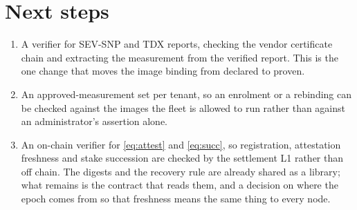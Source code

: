 \documentclass[11pt,a4paper]{article}
\begin{document}
\section{Next steps}

\begin{enumerate}[leftmargin=*]
  \item A verifier for SEV-SNP and TDX reports, checking the vendor certificate
    chain and extracting the measurement from the verified report. This is the
    one change that moves the image binding from declared to proven.
  \item An approved-measurement set per tenant, so an enrolment or a rebinding
    can be checked against the images the fleet is allowed to run rather than
    against an administrator's assertion alone.
  \item An on-chain verifier for \eqref{eq:attest} and \eqref{eq:succ}, so
    registration, attestation freshness and stake succession are checked by the
    settlement L1 rather than off chain. The digests and the recovery rule are
    already shared as a library; what remains is the contract that reads them,
    and a decision on where the epoch comes from so that freshness means the
    same thing to every node.
\end{enumerate}
\end{document}
